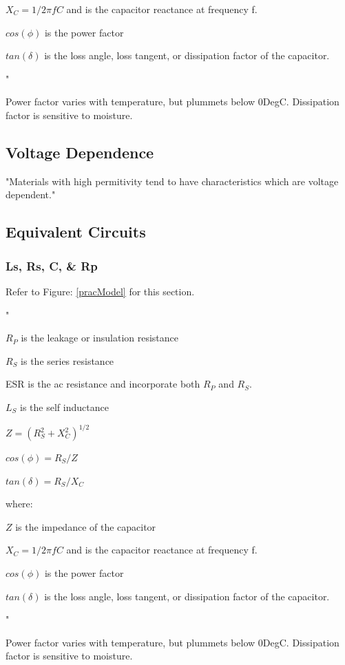 $X_C = 1 / 2\pi fC$ and is the capacitor reactance at frequency f.

$cos(\phi)$ is the power factor

$tan(\delta)$ is the loss angle, loss tangent, or dissipation factor of the capacitor.

"

\cite{disc_comp}

Power factor varies with temperature, but plummets below 0DegC.
Dissipation factor is sensitive to moisture.\cite{disc_comp}

\subsection{Voltage Dependence}

"Materials with high permitivity tend to have characteristics which are voltage dependent."\cite{disc_comp}

\subsection{Equivalent Circuits}
\subsubsection{Ls, Rs, C, \& Rp}

Refer to Figure: \ref{pracModel} for this section.

"

$R_P$ is the leakage or insulation resistance

$R_S$ is the series resistance

ESR is the ac resistance and incorporate both $R_P$ and $R_S$.

$L_S$ is the self inductance 

$Z = (R_S^2 + X_C^2)^{1/2}$

$cos(\phi) = R_S / Z$

$tan(\delta) = R_S / X_C$

where:

$Z$ is the impedance of the capacitor

$X_C = 1 / 2\pi fC$ and is the capacitor reactance at frequency f.

$cos(\phi)$ is the power factor

$tan(\delta)$ is the loss angle, loss tangent, or dissipation factor of the capacitor.

"

\cite{disc_comp}

Power factor varies with temperature, but plummets below 0DegC.
Dissipation factor is sensitive to moisture.\cite{disc_comp}


